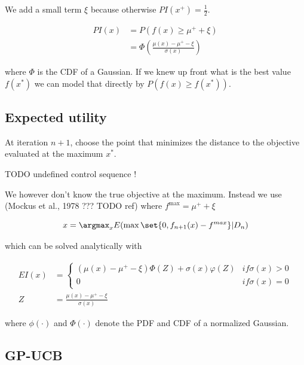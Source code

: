 We add a small term $\xi$ because otherwise $PI(x^+) = \frac{1}{2}.$

\begin{align}
  PI(x) &= P(f(x) \geq \mu^+ + \xi) \\
        &= \Phi \left(\frac{\mu(x) - \mu^+ - \xi}{\sigma(x)} \right)
\end{align}

where $\Phi$ is the CDF of a Gaussian. If we knew up front what is the best
value $f(x^*)$ we can model that directly by $P(f(x) \geq f(x^*))$.


\subsection{Expected utility}

At iteration $n+1$, choose the point that minimizes the distance to the
objective evaluated at the maximum $x^*$.

TODO undefined control sequence !


We however don't know the true objective at the maximum. Instead we use (Mockus
et al., 1978 ??? TODO ref) where $f^{\max} = \mu^+ + \xi$

\begin{equation}
  x = \argmax_x E(\max\set{0, f_{n+1}(x) - f^{max}}|D_n)
\end{equation}

which can be solved analytically with

\begin{align}
  EI(x) &= \begin{cases}
    (\mu(x) - \mu^+ - \xi) \Phi(Z) + \sigma(x)\varphi(Z) & if \sigma(x) > 0 \\
    0 & if \sigma(x) = 0
  \end{cases} \\
  Z &= \frac{\mu(x) - \mu^+ - \xi}{\sigma(x)}
\end{align}

where $\phi(\cdot)$ and $\Phi(\cdot)$ denote the PDF and CDF of a normalized Gaussian.


\subsection{GP-UCB}

